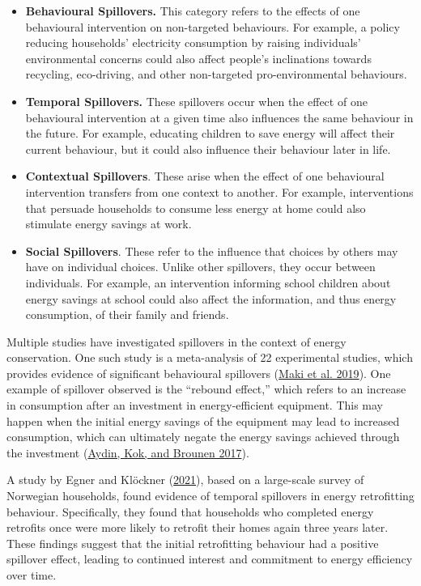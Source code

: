 \documentclass[
  12pt,
  captions=heading]{scrreport}
\begin{document}
\begin{itemize}
\item
  \textbf{Behavioural Spillovers.} This category refers to the effects
  of one behavioural intervention on non-targeted behaviours. For
  example, a policy reducing households' electricity consumption by
  raising individuals' environmental concerns could also affect people's
  inclinations towards recycling, eco-driving, and other non-targeted
  pro-environmental behaviours.
\item
  \textbf{Temporal Spillovers.} These spillovers occur when the effect
  of one behavioural intervention at a given time also influences the
  same behaviour in the future. For example, educating children to save
  energy will affect their current behaviour, but it could also
  influence their behaviour later in life.
\item
  \textbf{Contextual Spillovers}. These arise when the effect of one
  behavioural intervention transfers from one context to another. For
  example, interventions that persuade households to consume less energy
  at home could also stimulate energy savings at work.
\item
  \textbf{Social Spillovers}. These refer to the influence that choices
  by others may have on individual choices. Unlike other spillovers,
  they occur between individuals. For example, an intervention informing
  school children about energy savings at school could also affect the
  information, and thus energy consumption, of their family and friends.
\end{itemize}

Multiple studies have investigated spillovers in the context of energy
conservation. One such study is a meta-analysis of 22 experimental
studies, which provides evidence of significant behavioural spillovers
(\protect\hyperlink{ref-maki2019meta}{Maki et al. 2019}). One example of
spillover observed is the ``rebound effect,'' which refers to an
increase in consumption after an investment in energy-efficient
equipment. This may happen when the initial energy savings of the
equipment may lead to increased consumption, which can ultimately negate
the energy savings achieved through the investment
(\protect\hyperlink{ref-aydin2017energy}{Aydin, Kok, and Brounen 2017}).

A study by Egner and Klöckner
(\protect\hyperlink{ref-egner2021temporal}{2021}), based on a
large-scale survey of Norwegian households, found evidence of temporal
spillovers in energy retrofitting behaviour. Specifically, they found
that households who completed energy retrofits once were more likely to
retrofit their homes again three years later. These findings suggest
that the initial retrofitting behaviour had a positive spillover effect,
leading to continued interest and commitment to energy efficiency over
time.
\end{document}
